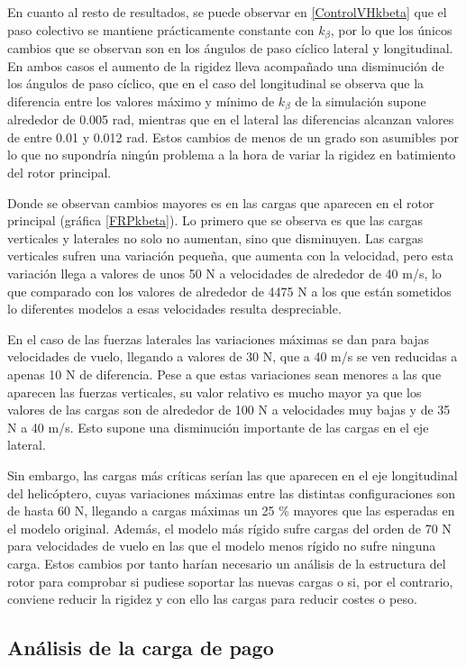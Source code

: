 En cuanto al resto de resultados, se puede observar en \ref{ControlVHkbeta} que el paso colectivo se mantiene prácticamente constante con $k_\beta$, por lo que los únicos cambios que se observan son en los ángulos de paso cíclico lateral y longitudinal. En ambos casos el aumento de la rigidez lleva acompañado una disminución de los ángulos de paso cíclico, que en el caso del longitudinal se observa que la diferencia entre los valores máximo y mínimo de $k_\beta$ de la simulación supone alrededor de 0.005 rad, mientras que en el lateral las diferencias alcanzan valores de entre 0.01 y 0.012 rad. Estos cambios de menos de un grado son asumibles por lo que no supondría ningún problema a la hora de variar la rigidez en batimiento del rotor principal.

Donde se observan cambios mayores es en las cargas que aparecen en el rotor principal (gráfica \ref{FRPkbeta}). Lo primero que se observa es que las cargas verticales y laterales no solo no aumentan, sino que disminuyen. Las cargas verticales sufren una variación pequeña, que aumenta con la velocidad, pero esta variación llega a valores de unos 50 N a velocidades de alrededor de 40 m/s, lo que comparado con los valores de alrededor de 4475 N a los que están sometidos lo diferentes modelos a esas velocidades resulta despreciable.

En el caso de las fuerzas laterales las variaciones máximas se dan para bajas velocidades de vuelo, llegando a valores de 30 N, que a 40 m/s se ven reducidas a apenas 10 N de diferencia. Pese a que estas variaciones sean menores a las que aparecen las fuerzas verticales, su valor relativo es mucho mayor ya que los valores de las cargas son de alrededor de 100 N a velocidades muy bajas y de 35 N a 40 m/s. Esto supone una disminución importante de las cargas en el eje lateral.

Sin embargo, las cargas más críticas serían las que aparecen en el eje longitudinal del helicóptero, cuyas variaciones máximas entre las distintas configuraciones son de hasta 60 N, llegando a cargas máximas un 25 \% mayores que las esperadas en el modelo original. Además, el modelo más rígido sufre cargas del orden de 70 N para velocidades de vuelo en las que el modelo menos rígido no sufre ninguna carga. Estos cambios por tanto harían necesario un análisis de la estructura del rotor para comprobar si pudiese soportar las nuevas cargas o si, por el contrario, conviene reducir la rigidez y con ello las cargas para reducir costes o peso.

\subsection{Análisis de la carga de pago}

